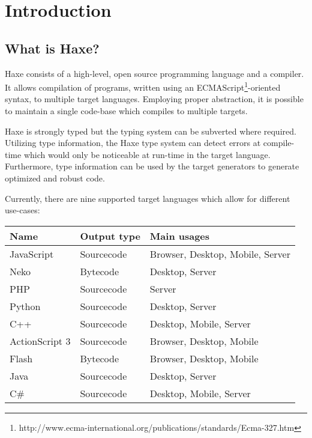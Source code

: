 \chapter{Introduction}
\label{introduction}

\section{What is Haxe?}
\label{introduction-what-is-haxe}


Haxe consists of a high-level, open source programming language and a compiler. It allows compilation of programs, written using an ECMAScript\footnote{http://www.ecma-international.org/publications/standards/Ecma-327.htm}-oriented syntax, to multiple target languages. Employing proper abstraction, it is possible to maintain a single code-base which compiles to multiple targets.

Haxe is strongly typed but the typing system can be subverted where required. Utilizing type information, the Haxe type system can detect errors at compile-time which would only be noticeable at run-time in the target language. Furthermore, type information can be used by the target generators to generate optimized and robust code.

Currently, there are nine supported target languages which allow for different use-cases:

\begin{center}
\begin{tabular}{| l | l | l |}
	\hline
	Name & Output type & Main usages \\ \hline
	JavaScript & Sourcecode & Browser, Desktop, Mobile, Server \\
	Neko & Bytecode & Desktop, Server \\
	PHP & Sourcecode & Server \\
	Python & Sourcecode & Desktop, Server \\
	C++ & Sourcecode & Desktop, Mobile, Server \\
	ActionScript 3 & Sourcecode & Browser, Desktop, Mobile \\
	Flash & Bytecode & Browser, Desktop, Mobile \\ 
	Java & Sourcecode & Desktop, Server \\
	C\# & Sourcecode & Desktop, Mobile, Server \\ \hline
\end{tabular}
\end{center}

